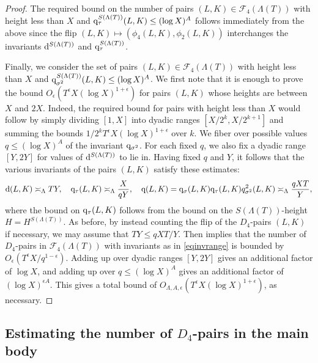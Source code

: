 \documentclass[10pt]{article}
\theoremstyle{plain}
\theoremstyle{definition}
\theoremstyle{remark}
\def\FF{{\mathcal F}}
\newcommand{\D}{{\rm d}}
\newcommand{\q}{{\rm q}}
\begin{document}
\begin{proof}
The required bound on the number of pairs $(L,K)\in\FF_4(\Lambda(T))$
with height less than $X$ and $\q_\tau^{S(\Lambda(T))}(L,K)\leq (\log
X)^A$ follows immediately from the above since the flip
$(L,K)\mapsto(\phi_4(L,K),\phi_2(L,K))$ interchanges the invariants
$\D^{S(\Lambda(T))}$ and $\q_\tau^{S(\Lambda(T))}$.

Finally, we consider the set of pairs $(L,K)\in\FF_4(\Lambda(T))$ with
height less than $X$ and $\q_{\sigma^2}^{S(\Lambda(T))}(L,K)\leq (\log
X)^A$. We first note that it is enough to prove the bound
$O_\epsilon(T^\epsilon X(\log X)^{1+\epsilon})$ for pairs $(L,K)$
whose heights are between $X$ and $2X$. Indeed, the required bound for
pairs with height less than $X$ would follow by simply dividing
$[1,X]$ into dyadic ranges $[X/2^k,X/2^{k+1}]$ and summing the bounds
$1/2^kT^\epsilon X(\log X)^{1+\epsilon}$ over $k$. We fiber over possible
values $q\leq (\log X)^A$ of the invariant $\q_{\sigma^2}$. For each
fixed $q$, we also fix a dyadic range $[Y,2Y]$ for values of
$\D^{S(\Lambda(T))}$ to lie in. Having fixed $q$ and $Y$, it follows
that the various invariants of the pairs $(L,K)$ satisfy these
estimates:
\begin{equation}\label{eqinvrange}
\D(L,K)\asymp_\Lambda TY,\quad \q_\tau(L,K)\asymp_\Lambda \frac{X}{qY},\quad
\q(L,K)=\q_\sigma(L,K)\q_\tau(L,K)q_{\sigma^2}^2(L,K)\asymp_\Lambda\frac{qXT}{Y},
\end{equation}
where the bound on $\q_\tau(L,K)$ follows from the bound on the $S(\Lambda(T))$-height $H = H^{S(\Lambda(T))}$.
As before, by instead counting the flip of the $D_4$-pairs $(L,K)$ if
necessary, we may assume that $TY\leq qXT/Y$. Then \cite[Proposition
  8.2]{D4preprint} implies that the number of $D_4$-pairs in
$\FF_4(\Lambda(T))$ with invariants as in \eqref{eqinvrange} is
bounded by $O_\epsilon(T^\epsilon X/q^{1-\epsilon})$. Adding up over
dyadic ranges $[Y,2Y]$ gives an additional factor of $\log X$, and
adding up over $q\leq (\log X)^A$ gives an additional factor of $(\log
X)^{\epsilon A}$. This gives a total bound of
$O_{\Lambda,A,\epsilon}(T^\epsilon X(\log X)^{1+\epsilon})$, as
necessary.
\end{proof}



\subsection{Estimating the number of $D_4$-pairs in the main body}
\end{document}

